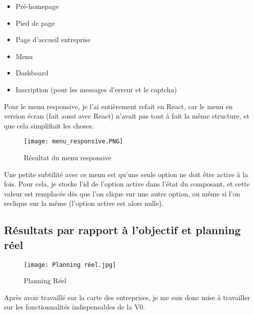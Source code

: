 \begin{itemize}
    \item Pré-homepage
    \item Pied de page
    \item Page d'accueil entreprise
    \item Menu
    \item Dashboard
    \item Inscription (pour les messages d'erreur et le captcha)
\end{itemize}

Pour le menu responsive, je l'ai entièrement refait en React, car le menu en version écran (fait aussi avec React) n'avait pas tout à fait la même structure, et que cela simplifiait les choses.

\begin{figure}[H]
    \texttt{[image: menu\_responsive.PNG]}
    \caption{Résultat du menu responsive}
\end{figure}

Une petite subtilité avec ce menu est qu'une seule option ne doit être active à la fois.
Pour cela, je stocke l'id de l'option active dans l'état du composant, et cette valeur est remplacée dès que l'on clique sur une autre option, ou même si l'on reclique sur la même (l'option active est alors nulle).



\pagebreak
\subsection{Résultats par rapport à l'objectif et planning réel}


\begin{figure}[H]
    \texttt{[image: Planning réel.jpg]}
    \caption{Planning Réel}
\end{figure}

Après avoir travaillé sur la carte des entreprises, je me suis donc mise à travailler sur les fonctionnalités indispensables de la V0.

